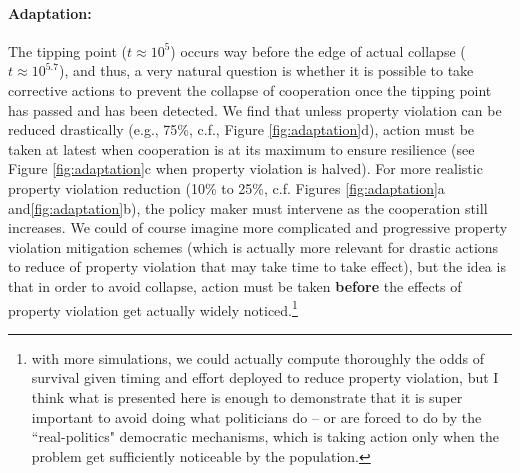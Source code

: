 \paragraph{Adaptation:} The tipping point  ($t \approx 10^5$) occurs way before the edge of actual collapse ($t \approx 10^{5.7}$), and thus, a very natural question is whether it is possible to take corrective actions to prevent the collapse of cooperation once the tipping point has passed and has 
been detected. We find that unless property violation can be reduced drastically (e.g., 75\%, c.f., Figure \ref{fig:adaptation}d), action must be taken at latest when cooperation is at its maximum  to ensure resilience (see Figure \ref{fig:adaptation}c when property violation is halved). For more realistic property violation reduction (10\% to 25\%, c.f. Figures \ref{fig:adaptation}a and\ref{fig:adaptation}b), the policy maker must intervene as the cooperation still increases. We could of course imagine more complicated and progressive property violation mitigation schemes (which is actually more relevant for drastic actions to reduce of property violation that may take time to take effect), but the idea is that in order to avoid collapse, action must be taken {\bf before} the effects of property violation get actually widely noticed.\footnote{with more simulations, we could actually compute thoroughly the odds of survival given timing and effort deployed to reduce property violation, but I think what is presented here is enough to demonstrate that it is super important to avoid doing what politicians do -- or are forced to do by the ``real-politics" democratic mechanisms, which is taking action only when the problem get sufficiently noticeable by the population.}\\

